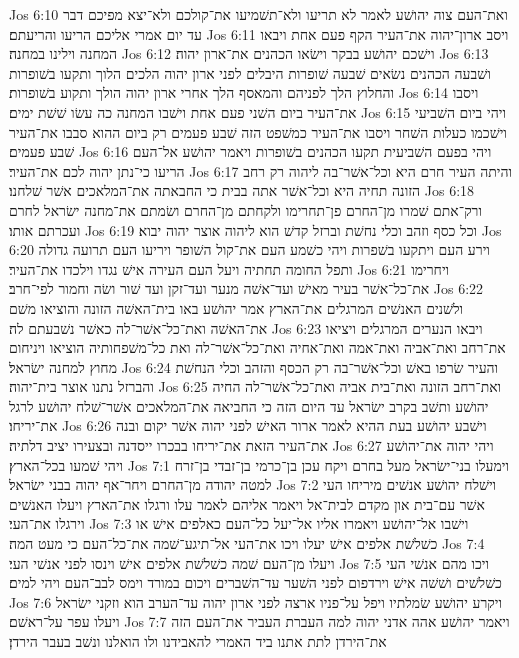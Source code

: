 Jos 6:10  ואת־העם צוה יהושׁע לאמר לא תריעו ולא־תשׁמיעו את־קולכם ולא־יצא מפיכם דבר עד יום אמרי אליכם הריעו והריעתם׃
Jos 6:11  ויסב ארון־יהוה את־העיר הקף פעם אחת ויבאו המחנה וילינו במחנה׃
Jos 6:12  וישׁכם יהושׁע בבקר וישׂאו הכהנים את־ארון יהוה׃
Jos 6:13  ושׁבעה הכהנים נשׂאים שׁבעה שׁופרות היבלים לפני ארון יהוה הלכים הלוך ותקעו בשׁופרות והחלוץ הלך לפניהם והמאסף הלך אחרי ארון יהוה הולך ותקוע בשׁופרות׃
Jos 6:14  ויסבו את־העיר ביום השׁני פעם אחת וישׁבו המחנה כה עשׂו שׁשׁת ימים׃
Jos 6:15  ויהי ביום השׁביעי וישׁכמו כעלות השׁחר ויסבו את־העיר כמשׁפט הזה שׁבע פעמים רק ביום ההוא סבבו את־העיר שׁבע פעמים׃
Jos 6:16  ויהי בפעם השׁביעית תקעו הכהנים בשׁופרות ויאמר יהושׁע אל־העם הריעו כי־נתן יהוה לכם את־העיר׃
Jos 6:17  והיתה העיר חרם היא וכל־אשׁר־בה ליהוה רק רחב הזונה תחיה היא וכל־אשׁר אתה בבית כי החבאתה את־המלאכים אשׁר שׁלחנו׃
Jos 6:18  ורק־אתם שׁמרו מן־החרם פן־תחרימו ולקחתם מן־החרם ושׂמתם את־מחנה ישׂראל לחרם ועכרתם אותו׃
Jos 6:19  וכל כסף וזהב וכלי נחשׁת וברזל קדשׁ הוא ליהוה אוצר יהוה יבוא׃
Jos 6:20  וירע העם ויתקעו בשׁפרות ויהי כשׁמע העם את־קול השׁופר ויריעו העם תרועה גדולה ותפל החומה תחתיה ויעל העם העירה אישׁ נגדו וילכדו את־העיר׃
Jos 6:21  ויחרימו את־כל־אשׁר בעיר מאישׁ ועד־אשׁה מנער ועד־זקן ועד שׁור ושׂה וחמור לפי־חרב׃
Jos 6:22  ולשׁנים האנשׁים המרגלים את־הארץ אמר יהושׁע באו בית־האשׁה הזונה והוציאו משׁם את־האשׁה ואת־כל־אשׁר־לה כאשׁר נשׁבעתם לה׃
Jos 6:23  ויבאו הנערים המרגלים ויציאו את־רחב ואת־אביה ואת־אמה ואת־אחיה ואת־כל־אשׁר־לה ואת כל־משׁפחותיה הוציאו ויניחום מחוץ למחנה ישׂראל׃
Jos 6:24  והעיר שׂרפו באשׁ וכל־אשׁר־בה רק הכסף והזהב וכלי הנחשׁת והברזל נתנו אוצר בית־יהוה׃
Jos 6:25  ואת־רחב הזונה ואת־בית אביה ואת־כל־אשׁר־לה החיה יהושׁע ותשׁב בקרב ישׂראל עד היום הזה כי החביאה את־המלאכים אשׁר־שׁלח יהושׁע לרגל את־יריחו׃
Jos 6:26  וישׁבע יהושׁע בעת ההיא לאמר ארור האישׁ לפני יהוה אשׁר יקום ובנה את־העיר הזאת את־יריחו בבכרו ייסדנה ובצעירו יציב דלתיה׃
Jos 6:27  ויהי יהוה את־יהושׁע ויהי שׁמעו בכל־הארץ׃
Jos 7:1  וימעלו בני־ישׂראל מעל בחרם ויקח עכן בן־כרמי בן־זבדי בן־זרח למטה יהודה מן־החרם ויחר־אף יהוה בבני ישׂראל׃
Jos 7:2  וישׁלח יהושׁע אנשׁים מיריחו העי אשׁר עם־בית און מקדם לבית־אל ויאמר אליהם לאמר עלו ורגלו את־הארץ ויעלו האנשׁים וירגלו את־העי׃
Jos 7:3  וישׁבו אל־יהושׁע ויאמרו אליו אל־יעל כל־העם כאלפים אישׁ או כשׁלשׁת אלפים אישׁ יעלו ויכו את־העי אל־תיגע־שׁמה את־כל־העם כי מעט המה׃
Jos 7:4  ויעלו מן־העם שׁמה כשׁלשׁת אלפים אישׁ וינסו לפני אנשׁי העי׃
Jos 7:5  ויכו מהם אנשׁי העי כשׁלשׁים ושׁשׁה אישׁ וירדפום לפני השׁער עד־השׁברים ויכום במורד וימס לבב־העם ויהי למים׃
Jos 7:6  ויקרע יהושׁע שׂמלתיו ויפל על־פניו ארצה לפני ארון יהוה עד־הערב הוא וזקני ישׂראל ויעלו עפר על־ראשׁם׃
Jos 7:7  ויאמר יהושׁע אהה אדני יהוה למה העברת העביר את־העם הזה את־הירדן לתת אתנו ביד האמרי להאבידנו ולו הואלנו ונשׁב בעבר הירדן׃
